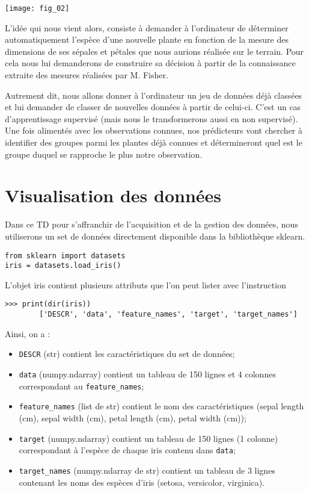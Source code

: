 \begin{center}
\texttt{[image: fig\_02]}
\end{center}

L'idée qui nous vient alors, consiste à demander à l'ordinateur de déterminer automatiquement l'espèce d'une nouvelle plante en fonction de la mesure des dimensions de ses sépales et pétales que nous aurions réalisée sur le terrain. Pour cela nous lui demanderons de construire sa décision à partir de la connaissance extraite des mesures réalisées par M. Fisher.

Autrement dit, nous allons donner à l'ordinateur un jeu de données déjà classées et lui demander de classer de nouvelles données à partir de celui-ci. C'est un cas d'apprentissage supervisé (mais nous le transformerons aussi en non supervisé).
Une fois alimentés avec les observations connues, nos prédicteurs vont chercher à identifier des groupes parmi les plantes déjà connues et détermineront quel est le groupe duquel se rapproche le plus notre observation.


\section{Visualisation des données}
Dans ce TD pour s'affranchir de l'acquisition et de la gestion des données, nous utiliserons un set de données directement disponible dans la bibliothèque sklearn.

\begin{verbatim}
from sklearn import datasets
iris = datasets.load_iris()
\end{verbatim}

L'objet iris contient plusieurs attributs que l'on peut lister avec l'instruction 

\begin{verbatim}
>>> print(dir(iris))
        ['DESCR', 'data', 'feature_names', 'target', 'target_names']
\end{verbatim}

Ainsi, on a :
\begin{itemize}
\item \texttt{DESCR} (str) contient les caractéristiques du set de données;
\item \texttt{data} (numpy.ndarray) contient un tableau de 150 lignes et 4 colonnes correspondant au \texttt{feature\_names};
\item \texttt{feature\_names} (list de str) contient le nom des caractéristiques (sepal length (cm), sepal width (cm), petal length (cm), petal width (cm));
\item \texttt{target} (numpy.ndarray) contient un tableau de 150 lignes (1 colonne) correspondant à l'espèce de chaque iris contenu dans \texttt{data};
\item \texttt{target\_names} (numpy.ndarray de str) contient un tableau de 3 lignes contenant les noms des espèces d'iris (setosa, versicolor, virginica).
\end{itemize}


